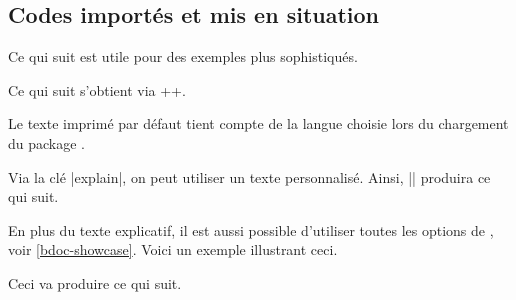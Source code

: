 

\subsection{Codes importés et mis en situation} \label{bdoc-latexshow}

Ce qui suit est utile pour des exemples plus sophistiqués.

\begin{bdocexa}[Showcase]
    Ce qui suit s'obtient via \bdocinlatex++.

    \medskip

    \begin{bdoc-doc-showcase}
    \end{bdoc-doc-showcase}
\end{bdocexa}


\begin{bdocnote}
    Le texte imprimé par défaut tient compte de la langue choisie lors du chargement du package .
\end{bdocnote}




\begin{bdocexa}
    Via la clé \bdocinlatex|explain|, on peut utiliser un texte personnalisé. Ainsi, \bdocinlatex|| produira ce qui suit.

    \medskip

    \begin{bdoc-doc-showcase}
    \end{bdoc-doc-showcase}
\end{bdocexa}




\begin{bdocexa}
    En plus du texte explicatif, il est aussi possible d'utiliser toutes les options de , voir \ref{bdoc-showcase}.
    Voici un exemple illustrant ceci.

    \medskip


    \medskip

    Ceci va produire ce qui suit.

    \medskip

    \begin{bdoc-doc-showcase}
        
    \end{bdoc-doc-showcase}
\end{bdocexa}



